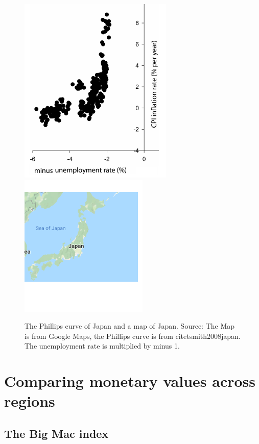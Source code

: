 \documentclass[]{book}
\begin{document}
\begin{figure}

{\centering \includegraphics[width=0.5\linewidth]{_resources/chapter_prices/japan4} \includegraphics[width=0.5\linewidth]{_resources/chapter_prices/japan3} 

}

\caption{The Phillips curve of Japan and a map of Japan. Source: The Map is from Google Maps, the Phillips curve is from citet{smith2008japan}. The unemployment rate is multiplied by minus 1. }\label{fig:pricejapan}
\end{figure}

\hypertarget{comparing-monetary-values-across-regions}{%
\section{Comparing monetary values across regions}\label{comparing-monetary-values-across-regions}}

\hypertarget{the-big-mac-index}{%
\subsection{The Big Mac index}\label{the-big-mac-index}}
\end{document}

